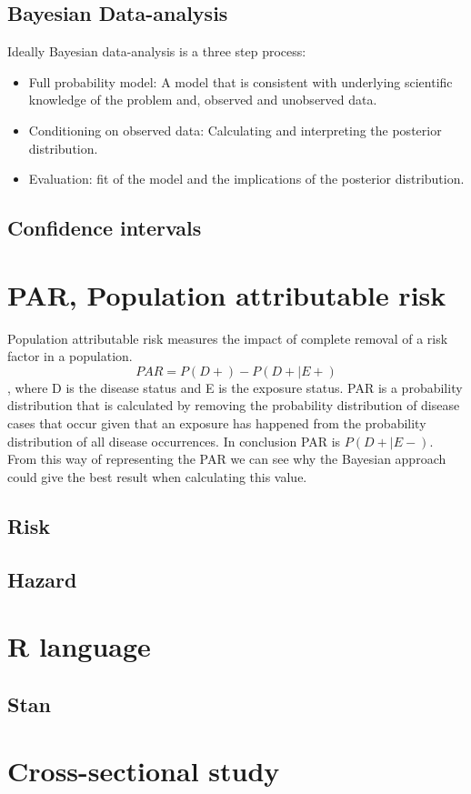 \subsection{Bayesian Data-analysis}\label{BayesianDataAnalysis}
Ideally Bayesian data-analysis is a three step process: 
\begin{itemize}
    \item Full probability model: A model that is consistent with underlying scientific knowledge of the problem and, observed and unobserved data. 
    \item Conditioning on observed data: Calculating and interpreting the posterior distribution.
    \item Evaluation: fit of the model and the implications of the posterior distribution.
\end{itemize}\cite{Gel2014BayesianDA}

\subsection{Confidence intervals}

\section{PAR, Population attributable risk}\label{PAR}
Population attributable risk measures the impact of complete removal of a risk factor in a population. 
\begin{equation}
PAR = P(D+) - P(D+| E+)
\end{equation}
, where D is the disease status and E is the exposure status. PAR is a probability distribution that is calculated by removing the probability distribution of disease cases that occur given that an exposure has happened from the probability distribution of all disease occurrences. In conclusion PAR is $P(D+| E-)$. From this way of representing the PAR we can see why the Bayesian approach could give the best result when calculating this value. \cite{Pirikahu2016BayesianMO}

\subsection{Risk}\label{Risk}
\subsection{Hazard}\label{Hazard}

\section{R language}\label{Rlanguage}
\subsection{Stan}\label{Stan}

\section{Cross-sectional study}\label{CrossSectionalStudy}

